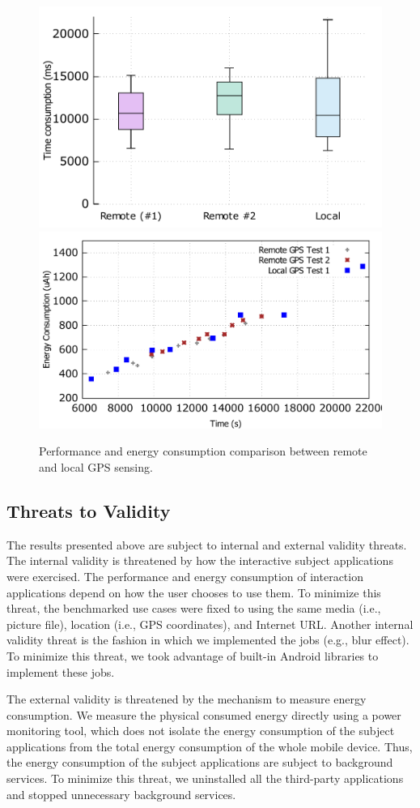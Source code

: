 \documentclass{sig-alternate}
\begin{document}
\begin{figure}
	\centering
		\includegraphics[width=.42\textwidth]{data/gps_perf.pdf}
		\includegraphics[width=.47\textwidth]{data/gps_energy_full.pdf}
	\caption{Performance and energy consumption comparison between remote and local GPS sensing.}
	\label{fig:gps_perf}
\end{figure}

\subsection{Threats to Validity}
The results presented above are subject to internal and external validity threats. The internal validity is threatened by how the interactive subject applications were exercised. The performance and energy consumption of interaction applications depend on how the user chooses to use them. To minimize this threat, the benchmarked use cases were fixed to using the same media (i.e., picture file), location (i.e., GPS coordinates), and Internet URL. Another internal validity threat is the fashion in which we implemented the jobs (e.g., blur effect). To minimize this threat, we took advantage of built-in Android libraries to implement these jobs.

The external validity is threatened by the mechanism to measure energy consumption. We measure the physical consumed energy directly using a power monitoring tool, which does not isolate the energy consumption of the subject applications from the total energy consumption of the whole mobile device. Thus, the energy consumption of the subject applications are subject to background services. To minimize this threat, we uninstalled all the third-party applications and stopped unnecessary background services.
\end{document}
